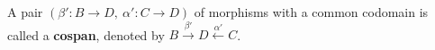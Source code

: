 \begin{definition}[Cospan]
    A pair \( (\beta' : B \mathop{\to} D,~\alpha' : C \mathop{\to} D) \) of morphisms with a common codomain is called a \textbf{cospan}, denoted by \( B \overset{\beta'}{\rightarrow} D \overset{\alpha'}{\leftarrow} C \). 
\end{definition} 